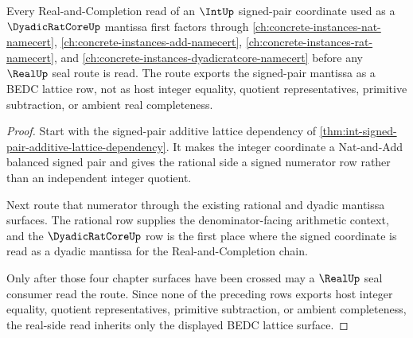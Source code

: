 \begin{theorem}
\label{thm:int-dyadic-mantissa-real-route}
Every Real-and-Completion read of an $\IntUp$ signed-pair coordinate used as a
$\DyadicRatCoreUp$ mantissa first factors through
\autoref{ch:concrete-instances-nat-namecert},
\autoref{ch:concrete-instances-add-namecert},
\autoref{ch:concrete-instances-rat-namecert}, and
\autoref{ch:concrete-instances-dyadicratcore-namecert} before any
$\RealUp$ seal route is read. The route exports the signed-pair mantissa as a
BEDC lattice row, not as host integer equality, quotient representatives,
primitive subtraction, or ambient real completeness.
\end{theorem}
\begin{proof}
Start with the signed-pair additive lattice dependency of
\autoref{thm:int-signed-pair-additive-lattice-dependency}. It makes the
integer coordinate a Nat-and-Add balanced signed pair and gives the rational
side a signed numerator row rather than an independent integer quotient.

Next route that numerator through the existing rational and dyadic mantissa
surfaces. The rational row supplies the denominator-facing arithmetic context,
and the $\DyadicRatCoreUp$ row is the first place where the signed coordinate
is read as a dyadic mantissa for the Real-and-Completion chain.

Only after those four chapter surfaces have been crossed may a $\RealUp$ seal
consumer read the route. Since none of the preceding rows exports host integer
equality, quotient representatives, primitive subtraction, or ambient
completeness, the real-side read inherits only the displayed BEDC lattice
surface.
\end{proof}

